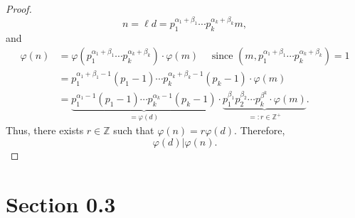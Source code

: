 \documentclass[10pt]{article}
\newcommand{\Z}{\mathbb{Z}}
\begin{document}
\begin{itemize}
\begin{proof}
$$n= \ell d = p_1^{\alpha_1+\beta_1}\cdots p_k^{\alpha_k+\beta_k}m, $$
and
\begin{align*}
\varphi(n) &= \varphi(p_1^{\alpha_1+\beta_1}\cdots p_k^{\alpha_k+\beta_k})\cdot \varphi(m) \quad \text{ since } \left(m, p_1^{\alpha_1+\beta_1} \cdots p_k^{\alpha_k+\beta_k}\right)=1 \\
&=p_1^{\alpha_1+\beta_1-1}(p_1-1)\cdots p_k^{\alpha_k+\beta_k-1}(p_k-1)\cdot \varphi(m) \\
&= \underbrace{p_1^{\alpha_1-1}(p_1-1)\cdots p_k^{\alpha_k-1}(p_k-1)}_{=\varphi(d)}\cdot \underbrace{p_1^{\beta_1}p_2^{\beta_2}\cdots p_k^{\beta^k}\cdot \varphi(m)}_{=:r \in \Z^{+}}.
\end{align*}
Thus, there exists $r \in \Z$ such that $\varphi(n)=r \varphi(d)$. Therefore,
$$\varphi(d)|\varphi(n).$$
\end{proof}

\end{itemize}



\section*{Section 0.3}
\end{document}
